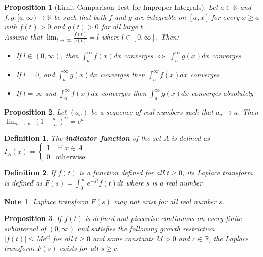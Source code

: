 \documentclass[14pt,twoside]{extreport}
\theoremstyle{dotless}
\newtheorem*{defn}{\footnotesize Definition}
\newtheorem*{note}{\footnotesize Note} %
\newtheorem*{prop}{\footnotesize Proposition} %
\begin{document}
\begin{prop}[Limit Comparison Test for Improper Integrals]
    Let $a \in \mathbb{R}$ and $f,g: [a, \infty) \to \mathbb{R}$ be such that both $f$ and $g$ are integrable on $[a,x]$ for every $x \geq a$ with $f(t) > 0$ and $g(t) > 0$ for all large $t$. \\ Assume that
    $\displaystyle \lim_{t \to \infty} \frac{f(t)}{g(t)} = l$ where $l \in [0, \infty]$. Then:
    \begin{itemize}
        \item If $l \in (0, \infty)$, then $\int_a^\infty f(x)dx$ converges $\iff$ $\int_a^\infty g(x)dx$ converges
        \item If $l = 0$, and $\int_a^\infty g(x)dx$ converges then $\int_a^\infty f(x)dx$ converges
        \item If $l = \infty$ and $\int_a^\infty f(x)dx$ converges then $\int_a^\infty g(x)dx$ converges absolutely
    \end{itemize}
\end{prop}

\begin{prop}
    Let $(a_n)$ be a sequence of real numbers such that $a_n \to a$. Then $\lim_{n \to \infty} \left( 1 + \frac{a_n}{n} \right)^n = e^a$ 
\end{prop}

\begin{defn}
    The \textbf{indicator function} of the set $A$ is defined as $I_A (x) = \begin{cases} 1 & \text{ if } x \in A \\ 0 & \text{otherwise} \end{cases}$
\end{defn}

\begin{defn}
    If $f(t)$ is a function defined for all $t \geq 0$, its Laplace transform is defined as $F(s) = \int_0^\infty e^{-st} f(t) dt$ where $s$ is a real number
\end{defn}

\begin{note}
    Laplace transform $F(s)$ may not exist for all real number $s$.
\end{note}

\begin{prop}
    If $f(t)$ is defined and piecewise continuous on every finite subinterval of $(0, \infty)$ and satisfies the following growth restriction $|f(t)| \leq M e^{ct}$ for all $t \geq 0$ and some constants $M > 0$ and $c \in \mathbb{R}$, the Laplace transform $F(s)$ exists for all $s \geq c$.
\end{prop}
\end{document}
